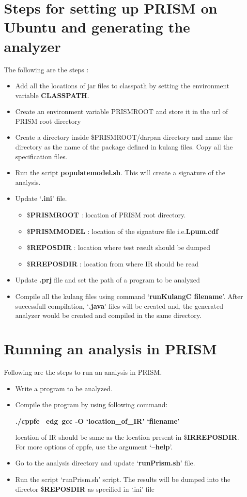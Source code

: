 \documentclass[11pt,a4paper,openright]{report}
\begin{document}
\section{Steps for setting up PRISM on Ubuntu and generating the analyzer}

The following are the steps :
\begin{itemize}
 \item  Add all the locations of jar files to classpath by setting the environment variable \textbf{CLASSPATH}. 
 \item Create an environment variable PRISMROOT and store it in the url of PRISM root directory
 \item Create a directory inside \$PRISMROOT/darpan directory and name the directory as the name of the package defined in kulang 
 files. Copy all the specification files.
 \item Run the script \textbf{populatemodel.sh}. This will create a signature of the analysis.
 \item Update `\textbf{.ini}' file.
	\begin{itemize}
	 \item \$\textbf{PRISMROOT} : location of PRISM root directory.
	 \item \$\textbf{PRISMMODEL} : location of the signature file i.e.\textbf{Lpum.cdf}
	 \item \$\textbf{REPOSDIR} : location where test result should be dumped
	 \item \$\textbf{RREPOSDIR} : location from where IR should be read
	\end{itemize}
\item Update  \textbf{.prj} file and set the path of a program to be analyzed
\item Compile all the kulang files using command `\textbf{runKulangC filename}'. After successfull compilation, `\textbf{.java}' 
 files will be created and, the generated analyzer would be created and compiled in the same directory.
\end{itemize}

\section{Running an analysis in PRISM}
Following are the steps to run an analysis in PRISM.
\begin{itemize}
 \item Write a program to be analyzed.
 \item Compile the program by using following command:
 
 \textbf{./cppfe --edg--gcc -O `location\_of\_IR' `filename' }
 
 location of IR should be same as the location present in \$\textbf{IRREPOSDIR}. For more options of cppfe, use the argument 
 `\textbf{--help}'.
 
 \item Go to the analysis directory and update `\textbf{runPrism.sh}' file. 
 \item Run the script `runPrism.sh' script. The results will be dumped into the director \$\textbf{REPOSDIR} as specified in `.ini' file
 \end{itemize}
\end{document}
